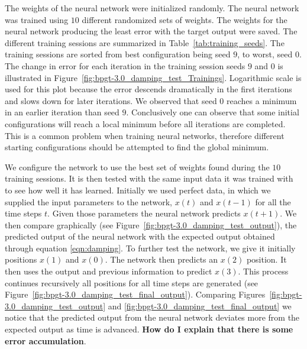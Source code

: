 \documentclass[11pt]{article}
\begin{document}
The weights of the neural network were initialized randomly. The neural network was trained using $10$ different randomized sets of
weights. The weights for the neural network producing the least error with the target output were saved. The different training sessions
are summarized in Table~\ref{tab:training_seeds}. The training sessions are sorted from best configuration being seed $9$, to worst,
seed $0$. The change in error for each iteration in the training session seeds $9$ and $0$ is illustrated in
Figure~\ref{fig:bpgt-3.0_damping_test_Trainings}. Logarithmic scale is used for this plot because the error descends dramatically in the
first iterations and slows down for later iterations. We observed that seed $0$ reaches a minimum in an earlier iteration than seed $9$.
Conclusively one can observe that some initial configurations will reach a local minimum before all iterations are completed. This is a
common problem when training neural networks, therefore different starting configurations should be attempted to find the global
minimum.

We configure the network to use the best set of weights found during the $10$ training sessions. It is then tested with the same input
data it was trained with to see how well it has learned. Initially we used perfect data, in which we supplied the input parameters to
the network, $x(t)$ and $x(t-1)$ for all the time steps $t$. Given those parameters the neural network predicts $x(t+1)$. We then
compare graphically (see Figure~\ref{fig:bpgt-3.0_damping_test_output}), the predicted output of the neural network with the expected
output obtained through equation \ref{eqn:damping}. To further test the network, we give it initially positions $x(1)$ and $x(0)$. The
network then predicts an $x(2)$ position. It then uses the output and previous information to predict $x(3)$. This process continues
recursively all positions for all time steps are generated (see Figure~\ref{fig:bpgt-3.0_damping_test_final_output}). Comparing
Figures~\ref{fig:bpgt-3.0_damping_test_output} and \ref{fig:bpgt-3.0_damping_test_final_output} we notice that the predicted output from
the neural network deviates more from the expected output as time is advanced. \textbf{How do I explain that there is some error
accumulation}.
 
\end{document}
